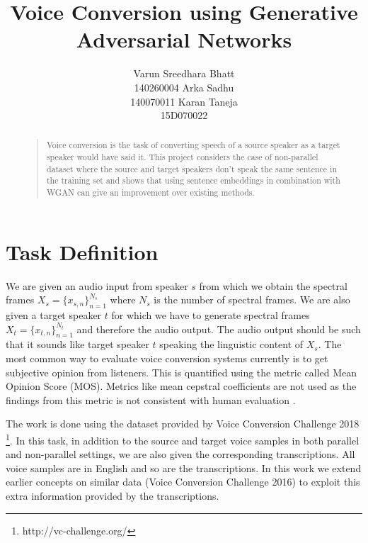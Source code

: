 \documentclass[letterpaper]{article}
\begin{document}
\title{Voice Conversion using Generative Adversarial Networks}
\author{Varun Sreedhara Bhatt \\
140260004
\And
Arka Sadhu \\
140070011
\And
Karan Taneja \\
15D070022
}
\nocopyright
\maketitle
\begin{abstract}
\begin{quote}
Voice conversion is the task of converting speech of a source speaker as a target speaker would have said it. This project considers the case of non-parallel dataset where the source and target speakers don't speak the same sentence in the training set and shows that using sentence embeddings in combination with WGAN can give an improvement over existing methods.
\end{quote}
\end{abstract}

\section{Task Definition}
We are given an audio input from speaker $s$ from which we obtain the spectral frames $X_s=\{x_{s,n}\}_{n=1}^{N_s}$ where $N_s$ is the number of spectral frames. We are also given a target speaker $t$ for which we have to generate spectral frames $X_t=\{x_{t,n}\}_{n=1}^{N_t}$ and therefore the audio output. The audio output should be such that it sounds like target speaker $t$ speaking the linguistic content of $X_s$. The most common way to evaluate voice conversion systems currently is to get subjective opinion from listeners. This is quantified using the metric called Mean Opinion Score (MOS). Metrics like mean cepstral coefficients are not used as the findings from this metric is not consistent with human evaluation \cite{vawgan}.

The work is done using the dataset provided by Voice Conversion Challenge 2018 \footnote{http://vc-challenge.org/}. In this task, in addition to the source and target voice samples in both parallel and non-parallel settings, we are also given the corresponding transcriptions. All voice samples are in English and so are the transcriptions. In this work we extend earlier concepts on similar data (Voice Conversion Challenge 2016) to exploit this extra information provided by the transcriptions.
\end{document}
